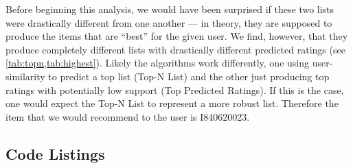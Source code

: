 Before beginning this analysis, we would have been surprised if these two lists were drastically different from one another --- in theory, they are supposed to produce the items that are ``best'' for the given user.  We find, however, that they produce completely different lists with drastically different predicted ratings (see \cref{tab:topn,tab:highest}).  Likely the algorithms work differently, one using user-similarity to predict a top list (Top-N List) and the other just producing top ratings with potentially low support (Top Predicted Ratings).  If this is the case, one would expect the Top-N List to represent a more robust list.  Therefore the item that we would recommend to the user is \textsf{I840620023}.




\begin{appendices}

\clearpage
\section{Code Listings}


\end{appendices}



% 



